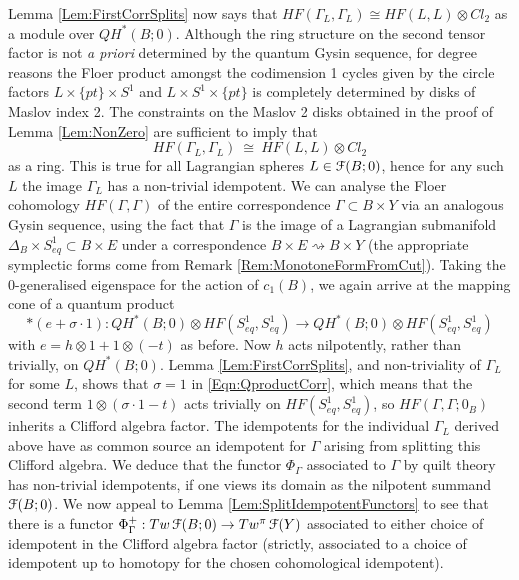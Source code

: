 \documentclass[reqno,10pt]{amsart}
\numberwithin{equation}{section}
\newcommand{\scrF}{\EuScript{F}}
\theoremstyle{remark}
\begin{document}
Lemma \ref{Lem:FirstCorrSplits} now says  that $HF(\Gamma_L, \Gamma_L) \cong HF(L,L) \otimes Cl_2$ as a module over $QH^*(B;0)$.  Although the ring structure on the second tensor factor is not \emph{a priori} determined by the quantum Gysin sequence, for degree reasons the Floer product amongst the codimension 1 cycles given by the circle factors $L \times \{pt\} \times S^1$ and $L \times S^1 \times \{pt\}$ is completely determined by disks of Maslov index 2.  The constraints on the  Maslov 2 disks obtained in the proof of Lemma \ref{Lem:NonZero} are sufficient to imply that 
\[
HF(\Gamma_L, \Gamma_L) \ \cong \ HF(L,L) \otimes Cl_2
\] as a ring. This is true for all Lagrangian spheres $L\in \scrF(B;0)$, hence for any such $L$ the image $\Gamma_L$ has a non-trivial idempotent.  We can analyse the Floer cohomology $HF(\Gamma, \Gamma)$ of the entire correspondence $\Gamma \subset B\times Y$ via an analogous Gysin sequence, using the fact that $\Gamma$ is the image of a Lagrangian submanifold $\Delta_B \times S^1_{eq} \subset B\times E$ under a correspondence $B\times E \rightsquigarrow B\times Y$ (the appropriate symplectic forms come from Remark \ref{Rem:MonotoneFormFromCut}).  Taking the $0$-generalised eigenspace for the action of $c_1(B)$, we again arrive at the mapping cone of a quantum product
\begin{equation} \label{Eqn:QproductCorr}
\ast (e+ \sigma \cdot 1): QH^*(B;0) \otimes HF(S^1_{eq}, S^1_{eq}) \longrightarrow QH^*(B;0) \otimes HF(S^1_{eq}, S^1_{eq})
\end{equation}
with $e = h\otimes 1 + 1 \otimes (-t)$ as before.  Now $h$ acts nilpotently, rather than trivially, on $QH^*(B;0)$.  Lemma \ref{Lem:FirstCorrSplits}, and non-triviality of $\Gamma_L$ for some $L$, shows that $\sigma = 1$ in \eqref{Eqn:QproductCorr}, which means that the second term $1 \otimes (\sigma \cdot 1 - t)$ acts trivially on $HF(S^1_{eq}, S^1_{eq})$, so $HF(\Gamma, \Gamma; 0_B)$ inherits a Clifford algebra factor. The idempotents for the individual $\Gamma_L$ derived above have as common source an idempotent for $\Gamma$ arising from splitting this Clifford algebra. We deduce that the functor $\Phi_{\Gamma}$ associated to $\Gamma$ by quilt theory has non-trivial idempotents, if one views its domain as the nilpotent summand $\scrF(B;0)$. 
 We now appeal to Lemma \ref{Lem:SplitIdempotentFunctors} to see that there is a functor $\Phi_{\Gamma}^+: Tw\,\scrF(B;0) \rightarrow Tw^{\pi}\,\scrF(Y)$ associated to either choice of idempotent in the Clifford algebra factor (strictly, associated to a choice of idempotent up to homotopy for the chosen cohomological idempotent).
\end{document}
